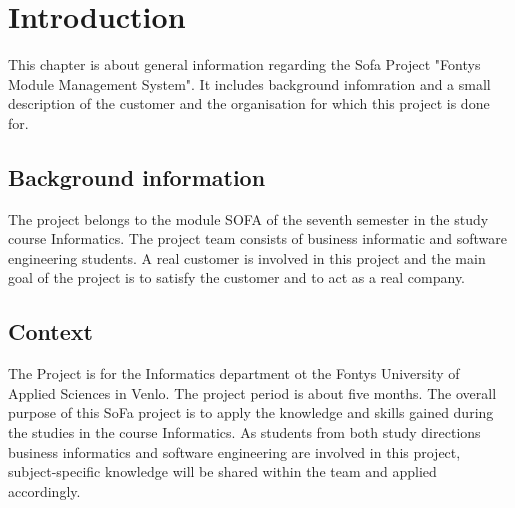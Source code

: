 \chapter{Introduction}
This chapter is about general information regarding the Sofa Project "Fontys Module Management System".
It includes background infomration and a small description of the customer and the organisation for which
this project is done for.

\section{Background information}
The project belongs to the module SOFA of the seventh semester in the study course Informatics.
The project team consists of business informatic and software engineering students. A real customer is involved in this project
and the main goal of the project is to satisfy the customer and to act as a real company.

\section{Context}
The Project is for the Informatics department ot the Fontys University of Applied Sciences in Venlo. The project period is about five months. 
The overall purpose of this SoFa project is to apply the knowledge and skills gained
during the studies in the course Informatics. As students from both study directions business informatics
and software engineering are involved in this project, subject-specific knowledge will be shared within the team
and applied accordingly.